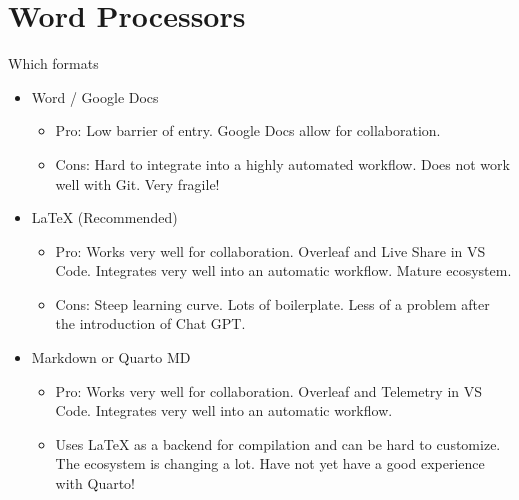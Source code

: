 \documentclass{beamer}
\begin{document}
\section{Word Processors}
\begin{frame}{Which formats}
\begin{itemize}
    \item Word / Google Docs
    \begin{itemize}
        \item Pro: Low barrier of entry. Google Docs allow for collaboration. \item Cons: Hard to integrate into a highly automated workflow. Does not work well with Git. Very fragile!
    \end{itemize}
    \item LaTeX (Recommended)
    \begin{itemize}
        \item Pro: Works very well for collaboration. Overleaf and Live Share in VS Code. Integrates very well into an automatic workflow. Mature ecosystem.
        \item Cons: Steep learning curve. Lots of boilerplate. Less of a problem after the introduction of Chat GPT.
    \end{itemize}
    \item Markdown or Quarto MD
    \begin{itemize}
        \item Pro: Works very well for collaboration. Overleaf and Telemetry in VS Code. Integrates very well into an automatic workflow.
        \item Uses LaTeX as a backend for compilation and can be hard to customize. The ecosystem is changing a lot. Have not yet have a good experience with Quarto!
    \end{itemize}
\end{itemize}
    
\end{frame}
\end{document}
